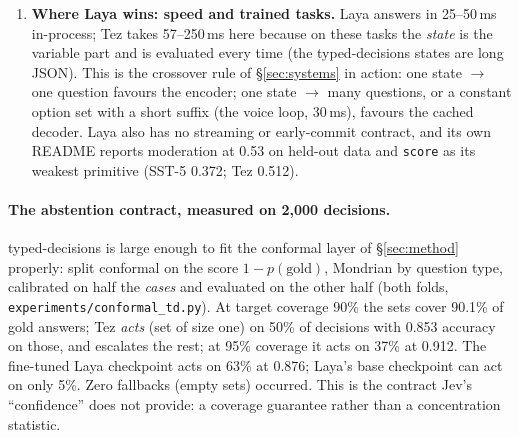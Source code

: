 \documentclass[11pt,a4paper]{article}
\newcommand{\code}[1]{\texttt{#1}}
\begin{document}
\begin{enumerate}[label=(\arabic*)]
\item \textbf{Where Laya wins: speed and trained tasks.} Laya answers in 25--50\,ms in-process; Tez takes 57--250\,ms here because on these tasks the \emph{state} is the variable part and is evaluated every time (the typed-decisions states are long JSON). This is the crossover rule of \S\ref{sec:systems} in action: one state $\to$ one question favours the encoder; one state $\to$ many questions, or a constant option set with a short suffix (the voice loop, 30\,ms), favours the cached decoder. Laya also has no streaming or early-commit contract, and its own README reports moderation at 0.53 on held-out data and \code{score} as its weakest primitive (SST-5 0.372; Tez 0.512).
\end{enumerate}

\paragraph{The abstention contract, measured on 2,000 decisions.} typed-decisions is large enough to fit the conformal layer of \S\ref{sec:method} properly: split conformal on the score $1-p(\text{gold})$, Mondrian by question type, calibrated on half the \emph{cases} and evaluated on the other half (both folds, \code{experiments/conformal\_td.py}). At target coverage 90\% the sets cover 90.1\% of gold answers; Tez \emph{acts} (set of size one) on 50\% of decisions with 0.853 accuracy on those, and escalates the rest; at 95\% coverage it acts on 37\% at 0.912. The fine-tuned Laya checkpoint acts on 63\% at 0.876; Laya's base checkpoint can act on only 5\%. Zero fallbacks (empty sets) occurred. This is the contract Jev's ``confidence'' does not provide: a coverage guarantee rather than a concentration statistic.
\end{document}
